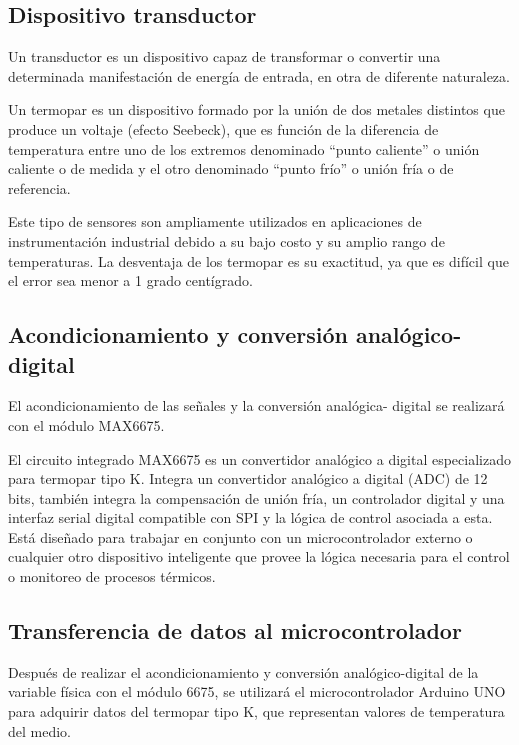 \subsection{Dispositivo transductor}

Un transductor es un dispositivo capaz de transformar o convertir una determinada manifestación de energía de entrada, en otra de diferente naturaleza.

Un termopar es un dispositivo formado por la unión de dos metales distintos que produce un voltaje (efecto Seebeck), que es función de la diferencia de temperatura entre uno de los extremos denominado “punto caliente” o unión caliente o de medida y el otro denominado “punto frío” o unión fría o de referencia.

Este tipo de sensores son ampliamente utilizados en aplicaciones de instrumentación industrial debido a su bajo costo y su amplio rango de temperaturas. La desventaja de los termopar es su exactitud, ya que es difícil que el error sea menor a 1 grado centígrado.

\subsection{Acondicionamiento y conversión analógico-digital}

El acondicionamiento de las señales y la conversión analógica- digital se realizará con el módulo MAX6675.

El circuito integrado MAX6675 es un convertidor analógico a digital especializado para termopar tipo K. Integra un convertidor analógico a digital (ADC) de 12 bits, también integra la compensación de unión fría, un controlador digital y una interfaz serial digital compatible con SPI y la lógica de control asociada a esta. Está diseñado para trabajar en conjunto con un microcontrolador externo o cualquier otro dispositivo inteligente que provee la lógica necesaria para el control o monitoreo de procesos térmicos.

\subsection{Transferencia de datos al microcontrolador}

Después de realizar el acondicionamiento y conversión analógico-digital de la variable física con el módulo 6675, se utilizará el microcontrolador Arduino UNO para adquirir datos del termopar tipo K, que representan valores de temperatura del medio.

